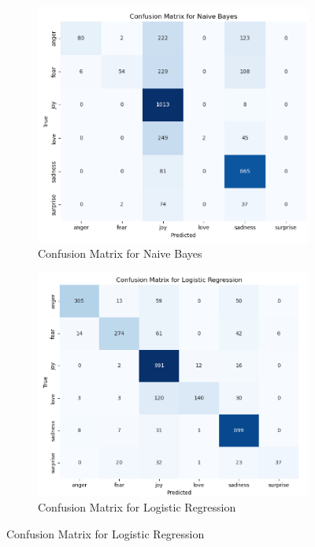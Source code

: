 \begin{figure}[h!]
	\centering
	\begin{subfigure}[b]{0.45\textwidth}
		\centering
		\includegraphics[width=\textwidth]{confusion_naive_bayes_init.png}
		\caption{Confusion Matrix for Naive Bayes}
		\label{fig:init_confusion_matrix_naive_bayes}
	\end{subfigure}
	\hfill
	\begin{subfigure}[b]{0.45\textwidth}
		\centering
		\includegraphics[width=\textwidth]{confusion_logistic_regression_init.png}
		\caption{Confusion Matrix for Logistic Regression}
		\label{fig:init_confusion_matrix_logistic_regression}
	\end{subfigure}
	

\end{figure}
